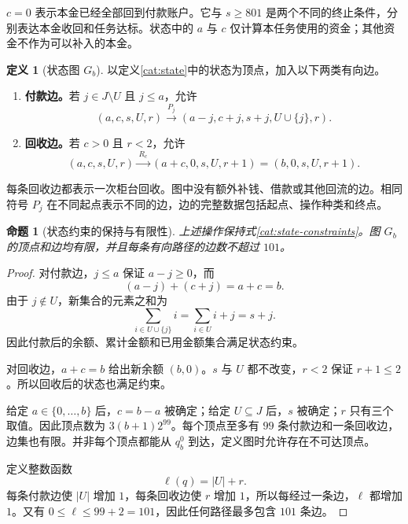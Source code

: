 \documentclass[UTF8,a4paper]{ctexbook}
\newtheorem{proposition}[theorem]{命题}
\theoremstyle{definition}
\newtheorem{definition}[theorem]{定义}
\numberwithin{equation}{chapter}
\newcommand{\1}{\mathbf{1}}
\begin{document}
$c=0$ 表示本金已经全部回到付款账户。它与 $s\ge801$ 是两个不同的终止条件，分别表达本金收回和任务达标。状态中的 $a$ 与 $c$ 仅计算本任务使用的资金；其他资金不作为可以补入的本金。

\begin{definition}[状态图 $G_b$]\label{cat:graph}
以定义\ref{cat:state}中的状态为顶点，加入以下两类有向边。
\begin{enumerate}
\item \textbf{付款边。}若 $j\in J\setminus U$ 且 $j\le a$，允许
\begin{equation}\label{cat:payment-edge}
(a,c,s,U,r)\xrightarrow{\,P_j\,}
(a-j,c+j,s+j,U\cup\{j\},r).
\end{equation}
\item \textbf{回收边。}若 $c>0$ 且 $r<2$，允许
\begin{equation}\label{cat:return-edge}
(a,c,s,U,r)\xrightarrow{\,R_c\,}
(a+c,0,s,U,r+1)=(b,0,s,U,r+1).
\end{equation}
\end{enumerate}
每条回收边都表示一次柜台回收。图中没有额外补钱、借款或其他回流的边。相同符号 $P_j$ 在不同起点表示不同的边，边的完整数据包括起点、操作种类和终点。
\end{definition}

\begin{proposition}[状态约束的保持与有限性]\label{cat:finite}
上述操作保持式\eqref{cat:state-constraints}。图 $G_b$ 的顶点和边均有限，并且每条有向路径的边数不超过 $101$。
\end{proposition}
\begin{proof}
对付款边，$j\le a$ 保证 $a-j\ge0$，而
\[
(a-j)+(c+j)=a+c=b.
\]
由于 $j\notin U$，新集合的元素之和为
\[
\sum_{i\in U\cup\{j\}}i=\sum_{i\in U}i+j=s+j.
\]
因此付款后的余额、累计金额和已用金额集合满足状态约束。

对回收边，$a+c=b$ 给出新余额 $(b,0)$。$s$ 与 $U$ 都不改变，$r<2$ 保证 $r+1\le2$。所以回收后的状态也满足约束。

给定 $a\in\{0,\ldots,b\}$ 后，$c=b-a$ 被确定；给定 $U\subseteq J$ 后，$s$ 被确定；$r$ 只有三个取值。因此顶点数为 $3(b+1)2^{99}$。每个顶点至多有 $99$ 条付款边和一条回收边，边集也有限。并非每个顶点都能从 $q_b^0$ 到达，定义图时允许存在不可达顶点。

定义整数函数
\[
\ell(q)=|U|+r.
\]
每条付款边使 $|U|$ 增加 $1$，每条回收边使 $r$ 增加 $1$，所以每经过一条边，$\ell$ 都增加 $1$。又有 $0\le\ell\le99+2=101$，因此任何路径最多包含 $101$ 条边。
\end{proof}
\end{document}
